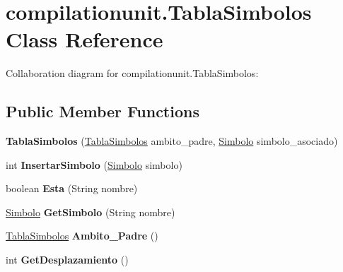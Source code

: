 \hypertarget{classcompilationunit_1_1_tabla_simbolos}{
\section{compilationunit.TablaSimbolos Class Reference}
\label{classcompilationunit_1_1_tabla_simbolos}
}


Collaboration diagram for compilationunit.TablaSimbolos:
\subsection*{Public Member Functions}
\begin{DoxyCompactItemize}
\item 
\hypertarget{classcompilationunit_1_1_tabla_simbolos_ad1c074d69e95f65f733ce25380121efe}{
{\bfseries TablaSimbolos} (\hyperlink{classcompilationunit_1_1_tabla_simbolos}{TablaSimbolos} ambito\_\-padre, \hyperlink{classcompilationunit_1_1_simbolo}{Simbolo} simbolo\_\-asociado)}
\label{classcompilationunit_1_1_tabla_simbolos_ad1c074d69e95f65f733ce25380121efe}

\item 
\hypertarget{classcompilationunit_1_1_tabla_simbolos_a0199f21a75e16a86ed608bc53b24d2ca}{
int {\bfseries InsertarSimbolo} (\hyperlink{classcompilationunit_1_1_simbolo}{Simbolo} simbolo)}
\label{classcompilationunit_1_1_tabla_simbolos_a0199f21a75e16a86ed608bc53b24d2ca}

\item 
\hypertarget{classcompilationunit_1_1_tabla_simbolos_a7734ab2a26f0091693e91e8f2a533d4e}{
boolean {\bfseries Esta} (String nombre)}
\label{classcompilationunit_1_1_tabla_simbolos_a7734ab2a26f0091693e91e8f2a533d4e}

\item 
\hypertarget{classcompilationunit_1_1_tabla_simbolos_ac846aab1ddde187ec93b6f4a5916d2e0}{
\hyperlink{classcompilationunit_1_1_simbolo}{Simbolo} {\bfseries GetSimbolo} (String nombre)}
\label{classcompilationunit_1_1_tabla_simbolos_ac846aab1ddde187ec93b6f4a5916d2e0}

\item 
\hypertarget{classcompilationunit_1_1_tabla_simbolos_a479828ee35be608e3637492717707682}{
\hyperlink{classcompilationunit_1_1_tabla_simbolos}{TablaSimbolos} {\bfseries Ambito\_\-Padre} ()}
\label{classcompilationunit_1_1_tabla_simbolos_a479828ee35be608e3637492717707682}

\item 
\hypertarget{classcompilationunit_1_1_tabla_simbolos_a788f9f38f3eece58c887df49a0728a68}{
int {\bfseries GetDesplazamiento} ()}
\label{classcompilationunit_1_1_tabla_simbolos_a788f9f38f3eece58c887df49a0728a68}


\end{DoxyCompactItemize}
